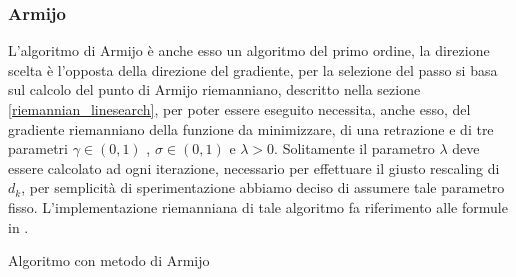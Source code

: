 \documentclass[a4paper, 12pt]{article}
\begin{document}
\subsubsection{Armijo}
L'algoritmo di Armijo è anche esso un algoritmo del primo ordine, la direzione scelta è l'opposta della direzione del gradiente, per la selezione del passo si basa sul calcolo del punto di Armijo riemanniano, descritto nella sezione \ref{riemannian_linesearch}, per poter essere eseguito necessita, anche esso, del gradiente riemanniano della funzione da minimizzare, di una retrazione e di tre parametri $\gamma \in (0,1)$ , $\sigma \in (0,1)$ e $\lambda > 0$. Solitamente il parametro $\lambda$ deve essere calcolato ad ogni iterazione, necessario per effettuare il giusto rescaling di $d_k$, per semplicità di sperimentazione abbiamo deciso di assumere tale parametro fisso. L'implementazione riemanniana di tale algoritmo fa riferimento alle formule in \cite{Iannazzo}.\\
\begin{center}
\begin{algorithm}[H]
\SetAlgoLined
{}
\caption{Algoritmo con metodo di Armijo}
\end{algorithm}
\end{center}
\end{document}
